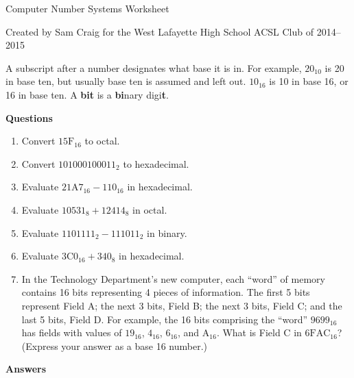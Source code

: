 \documentclass[12pt,letterpaper,fleqn]{article}
\begin{document}
\begin{center}
  Computer Number Systems Worksheet

  Created by Sam Craig for the West Lafayette High School ACSL Club of 2014--2015
\end{center}

A subscript after a number designates what base it is in.
For example, $20_{10}$ is 20 in base ten, but usually base ten is assumed and left out.
$10_{16}$ is 10 in base 16, or 16 in base ten.
A \textbf{bit} is a \textbf{bi}nary digi\textbf{t}.

\bigskip
\noindent \textbf{Questions}

\begin{enumerate}

\item Convert $15\text{F}_{16}$ to octal.

\item Convert $101000100011_2$ to hexadecimal.

\item Evaluate $21\text{A}7_{16} - 110_{16}$ in hexadecimal.

\item Evaluate $10531_8 + 12414_8$ in octal.

\item Evaluate $1101111_2 - 111011_2$ in binary.

\item Evaluate $3\text{C}0_{16} + 340_8$ in hexadecimal.

\item In the Technology Department's new computer, each ``word'' of memory
  contains 16 bits representing 4 pieces of information.
  The first 5 bits represent Field A; the next
  3 bits, Field B; the next 3 bits, Field C;
  and the last 5 bits, Field D.
  For example, the 16 bits comprising the ``word''
  $9699_{16}$ has fields with values of $19_{16}$, $4_{16}$,
  $6_{16}$, and $\text{A}_{16}$. What is Field C in $6\text{FAC}_{16}$? (Express your answer as
  a base 16 number.)

\end{enumerate}

\pagebreak

\noindent \textbf{Answers}
\end{document}
